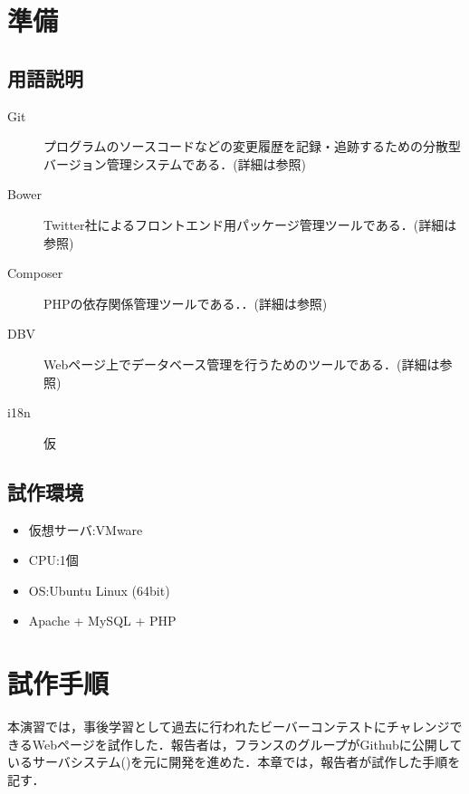 \documentclass[a4paper]{jarticle}
\begin{document}
\begin{multicols}{2}
\section{準備}

\subsection{用語説明}
\begin{description}
\item[Git]プログラムのソースコードなどの変更履歴を記録・追跡するための分散型バージョン管理システムである．(詳細は\cite{git}参照)
\end{description}

\begin{description}
\item[Bower]Twitter社によるフロントエンド用パッケージ管理ツールである．(詳細は\cite{bower}参照)
\end{description}

\begin{description}
\item[Composer] PHPの依存関係管理ツールである．．(詳細は\cite{composer}参照)

\end{description}

\begin{description}
\item[DBV]  Webページ上でデータベース管理を行うためのツールである．(詳細は\cite{dbv}参照)
\end{description}

\begin{description}
\item[i18n] 仮
\end{description}

\subsection{試作環境}
\begin{itemize}
\item 仮想サーバ:VMware
\item CPU:1個
\item OS:Ubuntu Linux (64bit)
\item Apache + MySQL + PHP
\end{itemize}

\section{試作手順}
本演習では，事後学習として過去に行われたビーバーコンテストにチャレンジできるWebページを試作した．報告者は，フランスのグループがGithubに公開しているサーバシステム(\cite{bebras-france-platform})を元に開発を進めた．本章では，報告者が試作した手順を記す．

\end{multicols}
\end{document}

